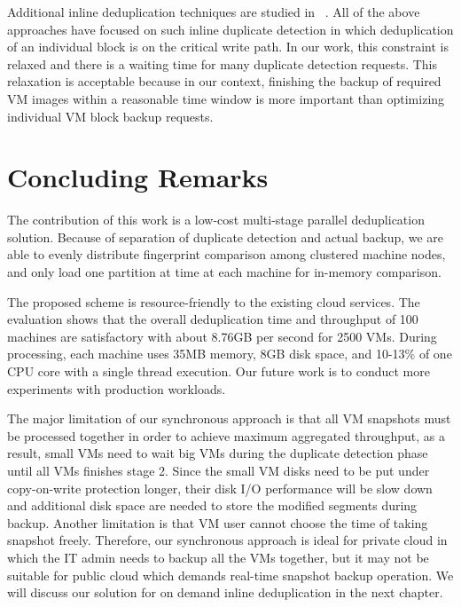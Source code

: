Additional inline deduplication techniques are studied in ~\cite{sparseindex09,Guo2011,Srinivasan2012}.
All of the above approaches have focused on
such inline duplicate detection in which  deduplication of an individual block  is on the critical write path.
In our work, this constraint is relaxed and
there is a waiting time for many duplicate detection requests. This relaxation is acceptable because
in our context, finishing the backup of required VM images within a reasonable time window is more
important than optimizing individual VM block  backup requests.

\section{Concluding Remarks}
\label{offline:concl}
The contribution  of this work is a low-cost multi-stage parallel deduplication solution.
Because of separation  of duplicate detection and actual backup,
we are able to evenly distribute  fingerprint comparison among clustered machine
nodes, and only load one partition at time at each machine for in-memory comparison.

The proposed  scheme is resource-friendly to the existing cloud services.
The evaluation shows that the overall 
deduplication time and throughput of 100 machines  are satisfactory with 
about 8.76GB per second for 2500 VMs. During processing, each machine uses 
35MB memory, 8GB disk space, and 10-13\% of one CPU core with a single thread  execution.
Our future work is to conduct more experiments with production workloads.

The major limitation of our synchronous approach is that all VM snapshots must be processed together
in order to achieve maximum aggregated throughput, as a result, small VMs need to wait big VMs during
the duplicate detection phase until all VMs finishes stage 2. Since the small VM disks 
need to be put under copy-on-write protection longer, their disk I/O performance will be slow down
and  additional disk space are needed to store the modified segments during backup. Another limitation
is that VM user cannot choose the time of taking snapshot freely. Therefore, our synchronous approach 
is ideal for private cloud in which the IT admin needs to backup all the VMs together, but it may not
be suitable 
for public cloud which demands real-time snapshot backup operation. We will discuss our solution
for on demand inline deduplication in the next chapter.

